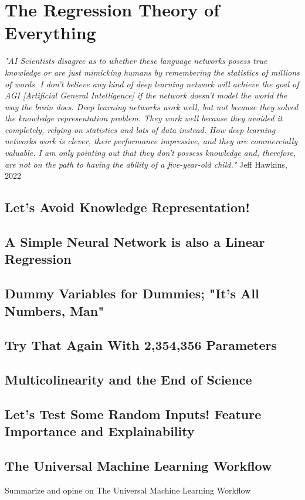 \setchapterpreamble[u]{\margintoc}
\chapter{The Regression Theory of Everything}

\textit{"AI Scientists disagree as to whether these language networks posess true knowledge or are just mimicking humans by remembering the statistics of millions of words. I don't believe any kind of deep learning network will achieve the goal of AGI [Artificial General Intelligence] if the network doesn't model the world the way the brain does. Deep learning networks work well, but not because they solved the knowledge representation problem. They work well because they avoided it completely, relying on statistics and lots of data instead. How deep learning networks work is clever, their performance impressive, and they are commercially valuable. I am only pointing out that they don't possess knowledge and, therefore, are not on the path to having the ability of a five-year-old child."} Jeff Hawkins, 2022 \cite{hawkins_2022}

\section{Let's Avoid Knowledge Representation!}

\section{A Simple Neural Network is also a Linear Regression}

\section{Dummy Variables for Dummies; "It's All Numbers, Man"}

\section{Try That Again With 2,354,356 Parameters}

\section{Multicolinearity and the End of Science}

\section{Let's Test Some Random Inputs! Feature Importance and Explainability}

\section{The Universal Machine Learning Workflow}

Summarize and opine on The Universal Machine Learning Workflow 
